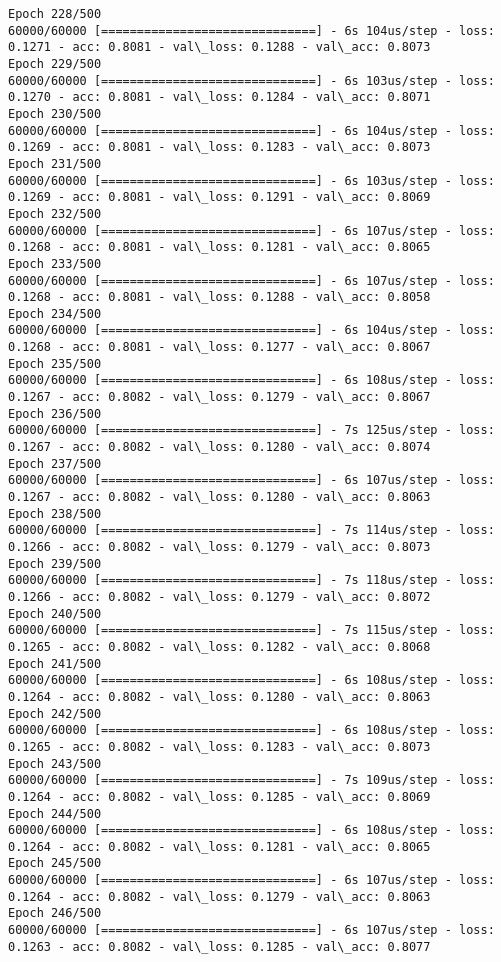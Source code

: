\documentclass[11pt]{article}
\begin{document}
\begin{Verbatim}[commandchars=\\\{\}]
Epoch 228/500
60000/60000 [==============================] - 6s 104us/step - loss: 0.1271 - acc: 0.8081 - val\_loss: 0.1288 - val\_acc: 0.8073
Epoch 229/500
60000/60000 [==============================] - 6s 103us/step - loss: 0.1270 - acc: 0.8081 - val\_loss: 0.1284 - val\_acc: 0.8071
Epoch 230/500
60000/60000 [==============================] - 6s 104us/step - loss: 0.1269 - acc: 0.8081 - val\_loss: 0.1283 - val\_acc: 0.8073
Epoch 231/500
60000/60000 [==============================] - 6s 103us/step - loss: 0.1269 - acc: 0.8081 - val\_loss: 0.1291 - val\_acc: 0.8069
Epoch 232/500
60000/60000 [==============================] - 6s 107us/step - loss: 0.1268 - acc: 0.8081 - val\_loss: 0.1281 - val\_acc: 0.8065
Epoch 233/500
60000/60000 [==============================] - 6s 107us/step - loss: 0.1268 - acc: 0.8081 - val\_loss: 0.1288 - val\_acc: 0.8058
Epoch 234/500
60000/60000 [==============================] - 6s 104us/step - loss: 0.1268 - acc: 0.8081 - val\_loss: 0.1277 - val\_acc: 0.8067
Epoch 235/500
60000/60000 [==============================] - 6s 108us/step - loss: 0.1267 - acc: 0.8082 - val\_loss: 0.1279 - val\_acc: 0.8067
Epoch 236/500
60000/60000 [==============================] - 7s 125us/step - loss: 0.1267 - acc: 0.8082 - val\_loss: 0.1280 - val\_acc: 0.8074
Epoch 237/500
60000/60000 [==============================] - 6s 107us/step - loss: 0.1267 - acc: 0.8082 - val\_loss: 0.1280 - val\_acc: 0.8063
Epoch 238/500
60000/60000 [==============================] - 7s 114us/step - loss: 0.1266 - acc: 0.8082 - val\_loss: 0.1279 - val\_acc: 0.8073
Epoch 239/500
60000/60000 [==============================] - 7s 118us/step - loss: 0.1266 - acc: 0.8082 - val\_loss: 0.1279 - val\_acc: 0.8072
Epoch 240/500
60000/60000 [==============================] - 7s 115us/step - loss: 0.1265 - acc: 0.8082 - val\_loss: 0.1282 - val\_acc: 0.8068
Epoch 241/500
60000/60000 [==============================] - 6s 108us/step - loss: 0.1264 - acc: 0.8082 - val\_loss: 0.1280 - val\_acc: 0.8063
Epoch 242/500
60000/60000 [==============================] - 6s 108us/step - loss: 0.1265 - acc: 0.8082 - val\_loss: 0.1283 - val\_acc: 0.8073
Epoch 243/500
60000/60000 [==============================] - 7s 109us/step - loss: 0.1264 - acc: 0.8082 - val\_loss: 0.1285 - val\_acc: 0.8069
Epoch 244/500
60000/60000 [==============================] - 6s 108us/step - loss: 0.1264 - acc: 0.8082 - val\_loss: 0.1281 - val\_acc: 0.8065
Epoch 245/500
60000/60000 [==============================] - 6s 107us/step - loss: 0.1264 - acc: 0.8082 - val\_loss: 0.1279 - val\_acc: 0.8063
Epoch 246/500
60000/60000 [==============================] - 6s 107us/step - loss: 0.1263 - acc: 0.8082 - val\_loss: 0.1285 - val\_acc: 0.8077

\end{Verbatim}
\end{document}
